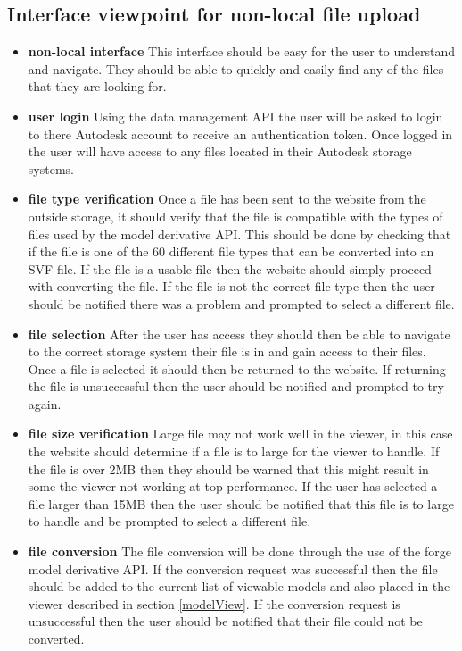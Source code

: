 \documentclass[letterpaper, 10pt, draftclsnofoot, compsoc, onecolumn]{IEEEtran}
\begin{document}
\subsection{Interface viewpoint for non-local file upload}
\begin{itemize}
	\item[]\textbf{non-local interface} This interface should be easy for the user to understand and navigate. They should be able to quickly and easily find any of the files that they are looking for.
	\item[]\textbf{user login} Using the data management API the user will be asked to login to there Autodesk account to receive an authentication token. Once logged in the user will have access to any files located in their Autodesk storage systems. 
	\item[]\textbf{file type verification} Once a file has been sent to the website from the outside storage, it should verify that the file is compatible with the types of files used by the model derivative API. This should be done by checking that if the file is one of the 60 different file types that can be converted into an SVF file. If the file is a usable file then the website should simply proceed with converting the file. If the file is not the correct file type then the user should be notified there was a problem and prompted to select a different file.  
	\item[]\textbf{file selection} After the user has access they should then be able to navigate to the correct storage system their file is in and gain access to their files. Once a file is selected it should then be returned to the website. If returning the file is unsuccessful then the user should be notified and prompted to try 
	again.
	\item[]\textbf{file size verification} Large file may not work well in the viewer, in this case the website should determine if a file is to large for the viewer to handle. If the file is over 2MB then they should be warned that this might result in some the viewer not working at top performance. If the user has selected a file larger than 15MB then the user should be notified that this file is to large to handle and be prompted to select a different file.
	\item[]\textbf{file conversion} The file conversion will be done through the use of the forge model derivative API. If the conversion request was successful then the file should be added to the current list of viewable models and also placed in the viewer described in section \ref{modelView}. If the conversion request is unsuccessful then the user should be notified that their file could not be converted. 
\end{itemize}
\end{document}
